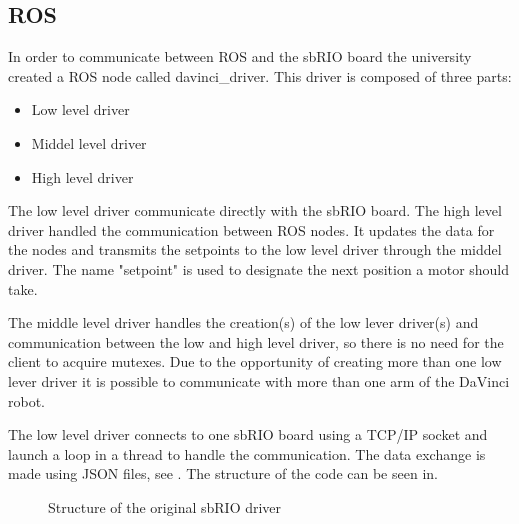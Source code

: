 \subsection{ROS}\label{sec:ros}

In order to communicate between ROS and the sbRIO board the university created a ROS node called davinci\_driver. This driver is composed of three parts:

\begin{itemize}
\item Low level driver
\item Middel level driver
\item High level driver
\end{itemize}

The low level driver communicate directly with the sbRIO board. The high level driver handled the communication between ROS nodes. It updates the data for the nodes and transmits the setpoints to the low level driver through the middel driver. The name "setpoint" is used to designate the next position a motor should take.

The middle level driver handles the creation(s) of the low lever driver(s) and communication between the low and high level driver, so there is no need for the client to acquire mutexes. Due to the opportunity of creating more than one low lever driver it is possible to communicate with more than one arm of the DaVinci robot.

The low level driver connects to one sbRIO board using a TCP/IP socket and launch a loop in a thread to handle the communication. The data exchange is made using \gls{JSON} files, see . The structure of the code can be seen in.

\begin{figure}[H]
\centering
{}
\caption{Structure of the original sbRIO driver}
\label{fig:original_driver}
\end{figure}

